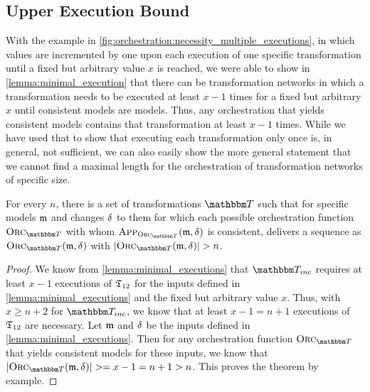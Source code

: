 \subsection{Upper Execution Bound}

With the example in \autoref{fig:orchestration:necessity_multiple_executions}, in which values are incremented by one upon each execution of one specific transformation until a fixed but arbitrary value $x$ is reached, we were able to show in \autoref{lemma:minimal_execution} that there can be transformation networks in which a transformation needs to be executed at least $x-1$ times for a fixed but arbitrary $x$ until consistent models are models.
Thus, any orchestration that yields consistent models contains that transformation at least $x-1$ times.
While we have used that to show that executing each transformation only once is, in general, not sufficient, we can also easily show the more general statement that we cannot find a maximal length for the orchestration of transformation networks of specific size.

\begin{theorem}
    \label{theorem:orchestration_fixed}
    For every $n$, there is a set of transformations $\transformationset{T}$ such that for specific models $\mathfrak{m}$ and changes $\mathfrak{\delta}_{}$ to them for which each possible orchestration function $\orcfunction{\transformationset{T}}$ with whom $\appfunction{\orcfunction{\transformationset{T}}}(\modeltuple{m}, \changetuple{})$ is consistent, delivers a sequence as $\orcfunction{\transformationset{T}}(\modeltuple{m}, \changetuple{})$ with $\abs{\orcfunction{\transformationset{T}}(\modeltuple{m}, \changetuple{})} > n$.
\end{theorem}
\begin{proof}
    We know from \autoref{lemma:minimal_executions} that $\transformationset{T}_{inc}$ requires at least $x-1$ executions of $\mathfrak{T}_{12}$ for the inputs defined in \autoref{lemma:minimal_executions} and the fixed but arbitrary value $x$.
    Thus, with $x \geq n+2$ for $\transformationset{T}_{inc}$, we know that at least $x-1 = n+1$ executions of $\mathfrak{T}_{12}$ are necessary.
    Let $\mathfrak{m}$ and $\mathfrak{\delta}_{}$ be the inputs defined in \autoref{lemma:minimal_executions}.
    Then for any orchestration function $\orcfunction{\transformationset{T}}$ that yields consistent models for these inputs, we know that $\abs{\orcfunction{\transformationset{T}}(\modeltuple{m}, \changetuple{})} >= x-1 = n+1 > n$.
    This proves the theorem by example.
\end{proof}

